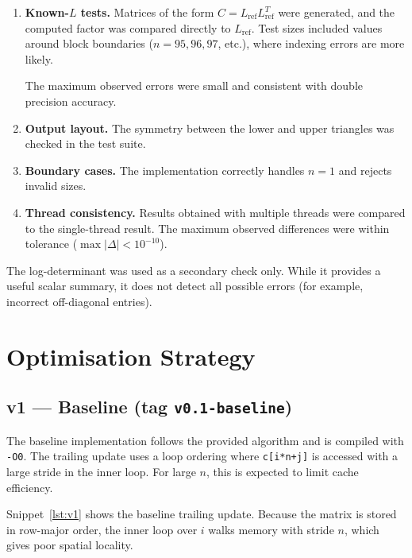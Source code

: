 \documentclass{article}
\newcommand{\snippetspace}{\Needspace{16\baselineskip}}
\begin{document}
\begin{enumerate}
  \item \textbf{Known-$L$ tests.}
  Matrices of the form $C = L_{\mathrm{ref}} L_{\mathrm{ref}}^T$ were generated,
  and the computed factor was compared directly to $L_{\mathrm{ref}}$.
  Test sizes included values around block boundaries
  ($n = 95, 96, 97$, etc.), where indexing errors are more likely.

  The maximum observed errors were small and consistent with double
  precision accuracy.

  \item \textbf{Output layout.}
  The symmetry between the lower and upper triangles was checked in the test
  suite.

  \item \textbf{Boundary cases.}
  The implementation correctly handles $n=1$ and rejects invalid sizes.

  \item \textbf{Thread consistency.}
  Results obtained with multiple threads were compared to the single-thread
  result. The maximum observed differences were within tolerance
  ($\max|\Delta| < 10^{-10}$).
\end{enumerate}

The log-determinant was used as a secondary check only. While it provides a
useful scalar summary, it does not detect all possible errors (for example,
incorrect off-diagonal entries).

\section{Optimisation Strategy}

\subsection{v1 --- Baseline (tag \texttt{v0.1-baseline})}

The baseline implementation follows the provided algorithm and is compiled
with \texttt{-O0}. The trailing update uses a loop ordering where
\texttt{c[i*n+j]} is accessed with a large stride in the inner loop.
For large $n$, this is expected to limit cache efficiency.

\snippetspace
Snippet~\ref{lst:v1} shows the baseline trailing update. Because the matrix is
stored in row-major order, the inner loop over $i$ walks memory with stride
$n$, which gives poor spatial locality.
\end{document}
